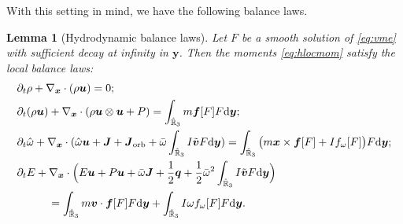 \documentclass[a4paper,11pt]{article}
\numberwithin{equation}{section}
\newtheorem{lemma}[theorem]{Lemma}
\theoremstyle{definition}
\newcommand{\bfs}[1]{{\boldsymbol #1}}
\newcommand{\bfx}{\boldsymbol{x}}
\newcommand{\bfy}{\boldsymbol{y}}
\newcommand{\bfv}{\boldsymbol{v}}
\newcommand{\bfuu}{\boldsymbol{u}}
\newcommand{\bff}{\boldsymbol{f}}
\newcommand{\bbr}{\mathbb R}
\def\d{{  \rm d}}
\begin{document}
With this setting in mind, we have the following balance laws. 

\begin{lemma}[Hydrodynamic balance laws]\label{lem:hbalance}
Let $F$ be a smooth solution of \eqref{eq:vme} with sufficient decay at infinity in $\bfy$.
Then the moments \eqref{eq:hlocmom} satisfy the local balance laws:
\begin{subequations}\label{eq:hblaw}
\begin{align}
&\partial_t\rho+\nabla_{\bfx}\cdot(\rho\bfuu)=0; \label{eq:hmass}\\
&\partial_t(\rho\bfuu)+\nabla_{\bfx}\cdot(\rho\bfuu\otimes\bfuu+P)=\int_{\hat{\bbr}_3} m \bff[F] F \d\bfy; \label{eq:hmom}\\
&\partial_t\hat\omega+\nabla_{\bfx}\cdot(\hat\omega \bfuu+\bfs{J} + \bfs{J}_{\rm orb} +\bar\omega\int_{\hat{\bbr}_3} I \tilde{\bfv} F \d\bfy)=\int_{\hat{\bbr}_3} \big( m \bfx\times\bff[F] + I f_\omega[F] \big) F \d\bfy; \label{eq:hangmom}\\
&\partial_tE+\nabla_{\bfx}\cdot\Big(E \bfuu+P \bfuu+\bar\omega \bfs{J}+\frac12\bfs{q}+\frac{1}{2}\bar\omega^2\int_{\hat{\bbr}_3} I \tilde{\bfv} F \d\bfy\Big) \nonumber\\
&\hspace{1cm}=\int_{\hat{\bbr}_3} m \bfv\cdot\bff[F] F \d\bfy + \int_{\hat{\bbr}_3} I \omega f_\omega[F] F \d\bfy.\label{eq:henergy}
\end{align}
\end{subequations}
\end{lemma}
\end{document}
